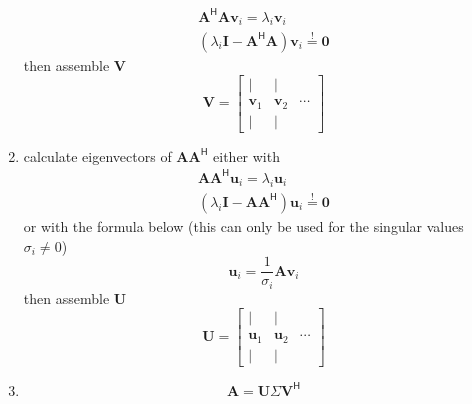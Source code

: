 \begin{enumerate}
          \begin{gather*}
              \mathbf{A}^{\mathsf{H}}\mathbf{A} \mathbf{v}_i = \lambda_i \mathbf{v}_i \\
              \left(\lambda_i \mathbf{I} -\mathbf{A}^{\mathsf{H}} \mathbf{A}\right)\mathbf{v}_i \overset{!}{=}\mathbf{0}
          \end{gather*}
          then assemble $\mathbf{V}$
          \begin{equation*}
              \mathbf{V} = \begin{bmatrix}
                  \vert        & \vert        &        \\
                  \mathbf{v}_1 & \mathbf{v}_2 & \cdots \\
                  \vert        & \vert        &
              \end{bmatrix}
          \end{equation*}
    \item calculate eigenvectors of $\mathbf{A}\mathbf{A}^{\mathsf{H}}$ either with
          \begin{gather*}
              \mathbf{A}\mathbf{A}^{\mathsf{H}} \mathbf{u}_i = \lambda_i \mathbf{u}_i \\
              \left(\lambda_{i} \mathbf{I} - \mathbf{A}\mathbf{A}^{\mathsf{H}}\right)\mathbf{u}_i \overset{!}{=}\mathbf{0}
          \end{gather*}
          or with the formula below (this can only be used for the singular values $\sigma_i \ne 0$)
          \begin{equation*}
              \mathbf{u}_i  = \frac{1}{\sigma_i}\mathbf{Av}_i
          \end{equation*}
          then assemble $\mathbf{U}$
          \begin{equation*}
              \mathbf{U} = \begin{bmatrix}
                  \vert        & \vert        &        \\
                  \mathbf{u}_1 & \mathbf{u}_2 & \cdots \\
                  \vert        & \vert        &
              \end{bmatrix}
          \end{equation*}
    \item \noindent\begin{equation*}
              \mathbf{A}=\mathbf{U}\Sigma \mathbf{V}^{\mathsf{H}}
          \end{equation*}
\end{enumerate}

